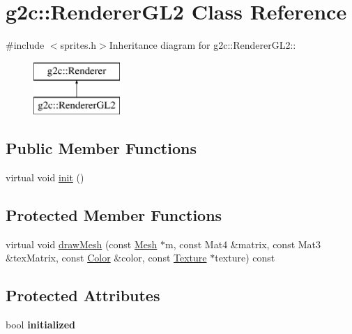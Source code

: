 \hypertarget{classg2c_1_1_renderer_g_l2}{
\section{g2c::RendererGL2 Class Reference}
\label{classg2c_1_1_renderer_g_l2}
}


{\ttfamily \#include $<$sprites.h$>$}Inheritance diagram for g2c::RendererGL2::\begin{figure}[H]
\begin{center}
\leavevmode
\includegraphics[height=2cm]{classg2c_1_1_renderer_g_l2}
\end{center}
\end{figure}
\subsection*{Public Member Functions}
\begin{DoxyCompactItemize}
\item 
virtual void \hyperlink{classg2c_1_1_renderer_g_l2_acd65c8c77dbecbe19c2bb19ef3847ce5}{init} ()
\end{DoxyCompactItemize}
\subsection*{Protected Member Functions}
\begin{DoxyCompactItemize}
\item 
virtual void \hyperlink{classg2c_1_1_renderer_g_l2_a42c4be1e991664f9a2ba8ef013cb00c1}{drawMesh} (const \hyperlink{classg2c_1_1_mesh}{Mesh} $\ast$m, const Mat4 \&matrix, const Mat3 \&texMatrix, const \hyperlink{classg2c_1_1_color}{Color} \&color, const \hyperlink{classg2c_1_1_texture}{Texture} $\ast$texture) const 
\end{DoxyCompactItemize}
\subsection*{Protected Attributes}
\begin{DoxyCompactItemize}
\item 
\hypertarget{classg2c_1_1_renderer_g_l2_a437787e58e897d930dcebed42f1be546}{
bool {\bfseries initialized}}
\label{classg2c_1_1_renderer_g_l2_a437787e58e897d930dcebed42f1be546}

\end{DoxyCompactItemize}



